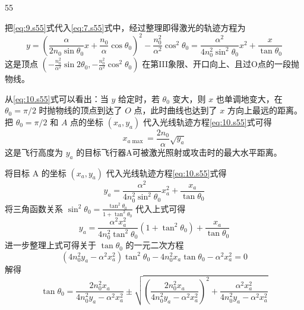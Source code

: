 \begin{solution}{55}
\begin{subsolution}
把\eqref{eq:9.s55}式代入\eqref{eq:7.s55}式中，经过整理即得激光的轨迹方程为
\begin{equation}
y = \left(\frac{\alpha}{2n_{0}\sin\theta_{0}}x + \frac{n_{0}}{\alpha}\cos\theta_{0}\right)^{2} - \frac{n_{0}^{2}}{\alpha^{2}}\cos^{2}\theta_{0} = \frac{\alpha^{2}}{4n_{0}^{2}\sin^{2}\theta_{0}}x^{2} + \frac{x}{\tan\theta_{0}}
\label{eq:10.s55}
\end{equation}
这是顶点 $\left(-\frac{n_{0}^{2}}{\alpha^{2}}\sin 2\theta_{0}, -\frac{n_{0}^{2}}{\alpha^{2}}\cos^{2}\theta_{0}\right)$ 在第III象限、开口向上、且过O点的一段抛物线。
\end{subsolution}
\begin{subsolution}
从\eqref{eq:10.s55}式可以看出：当 $y$ 给定时，若 $\theta_0$ 变大，则 $x$ 也单调地变大，在 $\theta_0 = \pi/2$ 时抛物线的顶点到达了 $O$ 点，此时曲线也达到了 $x$ 方向上最远的距离。把 $\theta_0 = \pi/2$ 和 $A$ 点的坐标 $(x_a, y_a)$ 代入光线轨迹方程\eqref{eq:10.s55}式可得
\begin{equation}
x_{a\max} = \frac{2n_{0}}{\alpha}\sqrt{y_{a}}
\label{eq:11.s55}
\end{equation}
这是飞行高度为 $y_{a}$ 的目标飞行器A可被激光照射或攻击时的最大水平距离。
\end{subsolution}
\begin{subsolution}
将目标 A 的坐标 $(x_{a},y_{a})$ 代入光线轨迹方程\eqref{eq:10.s55}式得
\begin{equation}
y_{a} = \frac{\alpha^{2}}{4n_{0}^{2}\sin^{2}\theta_{0}}x_{a}^{2} + \frac{x_{a}}{\tan\theta_{0}}
\label{eq:12.s55}
\end{equation}
将三角函数关系 $\sin^{2}\theta_{0} = \frac{\tan^{2}\theta_{0}}{1+\tan^{2}\theta_{0}}$ 代入上式可得
\begin{equation}
y_{a} = \frac{\alpha^{2}x_{a}^{2}}{4n_{0}^{2}\tan^{2}\theta_{0}}(1+\tan^{2}\theta_{0}) + \frac{x_{a}}{\tan\theta_{0}}
\label{eq:13.s55}
\end{equation}
进一步整理上式可得关于 $\tan\theta_{0}$ 的一元二次方程
\begin{equation}
(4n_{0}^{2}y_{a} - \alpha^{2}x_{a}^{2})\tan^{2}\theta_{0} - 4n_{0}^{2}x_{a}\tan\theta_{0} - \alpha^{2}x_{a}^{2} = 0
\label{eq:14.s55}
\end{equation}
解得
\begin{equation}
\tan\theta_{0} = \frac{2n_{0}^{2}x_{a}}{4n_{0}^{2}y_{a} - \alpha^{2}x_{a}^{2}} \pm \sqrt{\left(\frac{2n_{0}^{2}x_{a}}{4n_{0}^{2}y_{a} - \alpha^{2}x_{a}^{2}}\right)^{2} + \frac{\alpha^{2}x_{a}^{2}}{4n_{0}^{2}y_{a} - \alpha^{2}x_{a}^{2}}}
\label{eq:15.s55}

\end{equation}
\end{subsolution}
\end{solution}
